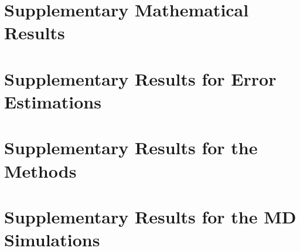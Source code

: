 \documentclass[a4paper]{ustthesis}
\begin{document}
\appendix

\chapter{Supplementary Mathematical Results}
\label{chp_math}


% 

\chapter{Supplementary Results for Error Estimations}
\label{chp_appendix_icm}


\chapter{Supplementary Results for the Methods}
\label{chp_appendix_soe}


\chapter{Supplementary Results for the MD Simulations}
\label{chp_appendix_quasiewald}


\end{document}
